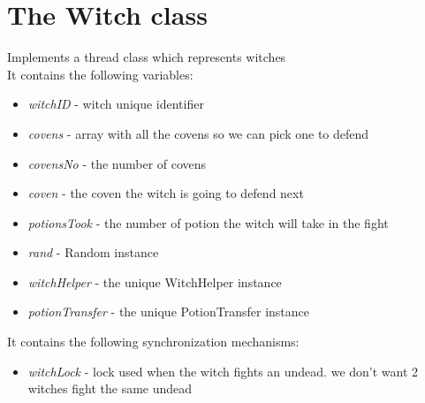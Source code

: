 \documentclass[14pt]{article}
\begin{document}
\section*{The Witch class}
\vspace{5 mm}
Implements a thread class which represents witches\\
It contains the following variables:\\ 
\begin{itemize}
            \item \textit{witchID} - witch unique identifier
            \item \textit{covens} - array with all the covens so we can pick one to defend
            \item \textit{covensNo} - the number of covens
            \item \textit{coven} - the coven the witch is going to defend next
            \item \textit{potionsTook} - the number of potion the witch will take in the fight
            \item \textit{rand} - Random instance
            \item \textit{witchHelper} - the unique WitchHelper instance
            \item \textit{potionTransfer} - the unique PotionTransfer instance
            
\end{itemize}

It contains the following synchronization mechanisms:\\
\begin{itemize}
            \item \textit{witchLock} - lock used when the witch fights an undead. we don't want 2 witches fight the same undead
\end{itemize}
\end{document}
